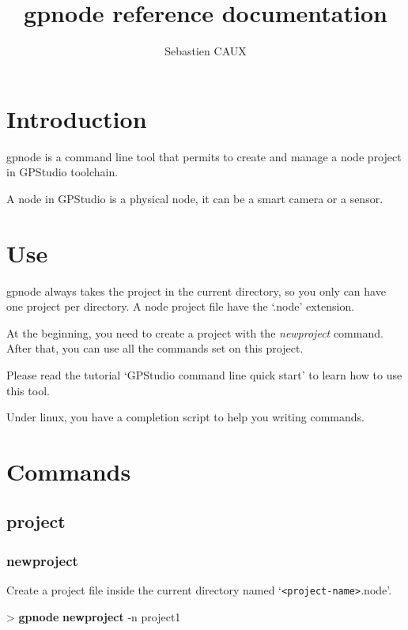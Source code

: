 \documentclass[10pt,a4paper]{article}
\author{Sebastien CAUX}
\title{gpnode reference documentation \version}
\begin{document}
\maketitle
\section{Introduction}
gpnode is a command line tool that permits to create and manage a node project in GPStudio toolchain.

A node in GPStudio is a physical node, it can be a smart camera or a sensor.

\section{Use}
gpnode always takes the project in the current directory, so you only can have one project per directory. A node project file have the `.node' extension.

At the beginning, you need to create a project with the \emph{newproject} command. After that, you can use all the commands set on this project.

Please read the tutorial `GPStudio command line quick start' to learn how to use this tool.

Under linux, you have a completion script to help you writing commands.

\section{Commands}
\subsection{project}
\subsubsection{newproject}

Create a project file inside the current directory named `\texttt{<project-name>}.node'.


\begin{sampletitle}
> \textbf{gpnode} \textbf{newproject} -n project1
\end{sampletitle}
\end{document}
